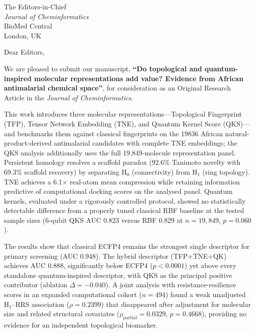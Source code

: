 \documentclass[11pt,a4paper]{letter}
\begin{document}
\begin{letter}{%
  The Editors-in-Chief \\
  \textit{Journal of Cheminformatics} \\
  BioMed Central \\
  London, UK
}

\opening{Dear Editors,}

We are pleased to submit our manuscript, \textbf{``Do topological and quantum-inspired molecular representations add value? Evidence from African antimalarial chemical space''}, for consideration as an Original Research Article in the \textit{Journal of Cheminformatics}.

This work introduces three molecular representations---Topological Fingerprint (TFP), Tensor Network Embedding (TNE), and Quantum Kernel Score (QKS)---and benchmarks them against classical fingerprints on the \num{19836} African natural-product-derived antimalarial candidates with complete TNE embeddings; the QKS analysis additionally uses the full 19{,}849-molecule representation panel. Persistent homology resolves a scaffold paradox (92.6\% Tanimoto novelty with 69.3\% scaffold recovery) by separating H$_0$ (connectivity) from H$_1$ (ring topology). TNE achieves a 6.1$\times$ real-atom mean compression while retaining information predictive of computational docking scores on the analysed panel. Quantum kernels, evaluated under a rigorously controlled protocol, showed no statistically detectable difference from a properly tuned classical RBF baseline at the tested sample sizes (6-qubit QKS AUC 0.823 versus RBF 0.829 at $n=19{,}849$, $p=0.060$).

The results show that classical ECFP4 remains the strongest single descriptor for primary screening (AUC 0.948). The hybrid descriptor (TFP+TNE+QK) achieves AUC 0.888, significantly below ECFP4 ($p<0.0001$) yet above every standalone quantum-inspired descriptor, with QKS as the principal positive contributor (ablation $\Delta=-0.040$). A joint analysis with resistance-resilience scores in an expanded computational cohort ($n=494$) found a weak unadjusted H$_1$--RRS association ($\rho=0.2399$) that disappeared after adjustment for molecular size and related structural covariates ($\rho_{\mathrm{partial}}=0.0329$, $p=0.4668$), providing no evidence for an independent topological biomarker.


\end{letter}
\end{document}
